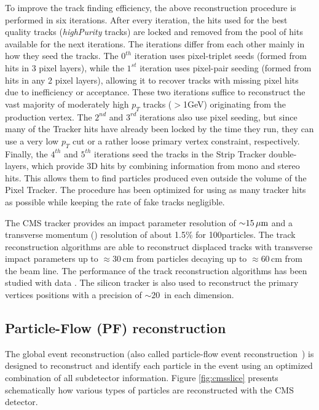 To improve the track finding efficiency, the above reconstruction procedure is
performed in six iterations. After every iteration, the hits
used for the best quality tracks (\textit{highPurity} tracks) are
locked and removed from the pool of hits available for the next iterations.
The iterations differ from each other mainly in how they
seed the tracks.
 The $0^{th}$ iteration uses pixel-triplet seeds (formed from
hits in 3 pixel layers), while the $1^{st}$ iteration uses pixel-pair seeding
(formed from hits in any 2 pixel layers), allowing it to recover tracks with
missing pixel hits due to inefficiency or acceptance. These two iterations
suffice to reconstruct the vast majority of moderately high $p_T$ tracks ($>$1GeV)
originating from the production vertex. The $2^{nd}$ and $3^{rd}$ iterations
also use pixel seeding, but since many of the Tracker hits have already been
locked by the time they run, they can use a very low $p_T$ cut or a rather
loose primary vertex constraint, respectively. Finally, the $4^{th}$ and $5^{th}$
iterations seed the tracks in the Strip Tracker double-layers, which provide 3D
hits by combining information from mono and stereo hits. This allows them to
find particles produced even outside the volume of the Pixel Tracker. The procedure has been optimized for using as
many tracker hits as possible while keeping the rate of fake tracks negligible.

The CMS tracker provides an impact parameter resolution of ${\sim}15\,\mu\text{m}$ and a transverse momentum (\pt) resolution of about 1.5\% for 100\GeV particles. 
The track reconstruction algorithms are able to reconstruct displaced tracks with transverse impact
parameters up to ${\approx}30$\,cm from particles decaying up to ${\approx}60$\,cm from the beam line.  The
performance of the track reconstruction algorithms has been studied with data
\cite{Khachatryan:2010pw}. 
The silicon
tracker is also used to reconstruct the primary vertices positions with a
precision of ${\sim}20$~\mum in each dimension.

\subsection{Particle-Flow (PF) reconstruction}

The global event reconstruction (also called particle-flow event reconstruction~\cite{CMS-PAS-PFT-09-001,CMS-PAS-PFT-10-001}) is designed to reconstruct and identify each particle in the event using an optimized combination of all subdetector information.
Figure \ref{fig:cmsslice} presents schematically how various types of particles are reconstructed
with the CMS detector.

